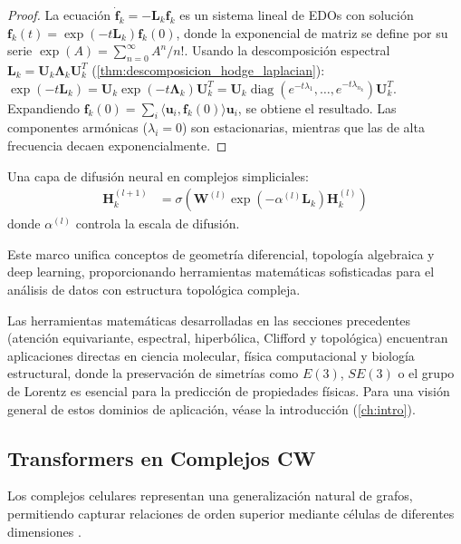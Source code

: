 \begin{proof}
La ecuación $\dot{\mathbf{f}}_k = -\mathbf{L}_k \mathbf{f}_k$ es un sistema lineal de EDOs con solución $\mathbf{f}_k(t) = \exp(-t\mathbf{L}_k) \mathbf{f}_k(0)$, donde la exponencial de matriz se define por su serie $\exp(A) = \sum_{n=0}^\infty A^n/n!$. Usando la descomposición espectral $\mathbf{L}_k = \mathbf{U}_k \boldsymbol{\Lambda}_k \mathbf{U}_k^T$ (\autoref{thm:descomposicion_hodge_laplacian}): $\exp(-t\mathbf{L}_k) = \mathbf{U}_k \exp(-t\boldsymbol{\Lambda}_k) \mathbf{U}_k^T = \mathbf{U}_k \operatorname{diag}(e^{-t\lambda_1}, \ldots, e^{-t\lambda_{n_k}}) \mathbf{U}_k^T$. Expandiendo $\mathbf{f}_k(0) = \sum_i \langle \mathbf{u}_i, \mathbf{f}_k(0)\rangle \mathbf{u}_i$, se obtiene el resultado. Las componentes armónicas ($\lambda_i = 0$) son estacionarias, mientras que las de alta frecuencia decaen exponencialmente.
\end{proof}

\begin{definition}\label{def:neural_diffusion_complejos}
Una capa de difusión neural en complejos simpliciales:
\begin{align}
    \mathbf{H}_k^{(l+1)} &= \sigma\left(\mathbf{W}^{(l)} \exp(-\alpha^{(l)} \mathbf{L}_k) \mathbf{H}_k^{(l)}\right)
\end{align}
donde $\alpha^{(l)}$ controla la escala de difusión.
\end{definition}

Este marco unifica conceptos de geometría diferencial, topología algebraica y deep learning, proporcionando herramientas matemáticas sofisticadas para el análisis de datos con estructura topológica compleja.

Las herramientas matemáticas desarrolladas en las secciones precedentes (atención equivariante, espectral, hiperbólica, Clifford y topológica) encuentran aplicaciones directas en ciencia molecular, física computacional y biología estructural, donde la preservación de simetrías como $E(3)$, $SE(3)$ o el grupo de Lorentz es esencial para la predicción de propiedades físicas. Para una visión general de estos dominios de aplicación, véase la introducción (\autoref{ch:intro}).

\subsection[Transformers en Complejos CW]{\glspl{Transformer} en Complejos CW}

Los complejos celulares representan una generalización natural de grafos, permitiendo capturar relaciones de orden superior mediante células de diferentes dimensiones \citep{bodnar2021cell}.

